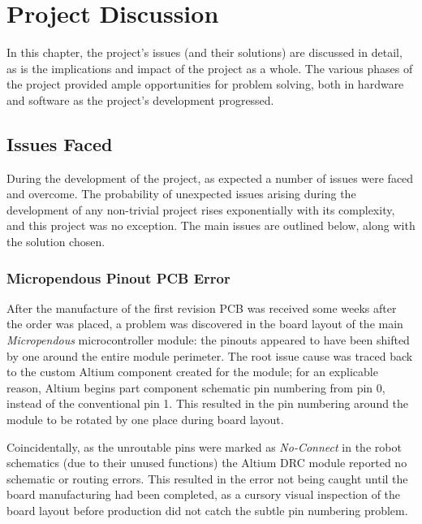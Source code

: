 \chapter{Project Discussion}
\label{chp:discussion}

In this chapter, the project's issues (and their solutions) are discussed in detail, as is the implications and impact of the project as a whole. The various phases of the project provided ample opportunities for problem solving, both in hardware and software as the project's development progressed.

\section{Issues Faced}

During the development of the project, as expected a number of issues were faced and overcome. The probability of unexpected issues arising during the development of any non-trivial project rises exponentially with its complexity, and this project was no exception. The main issues are outlined below, along with the solution chosen.

\subsection{Micropendous Pinout PCB Error}

After the manufacture of the first revision PCB was received some weeks after the order was placed, a problem was discovered in the board layout of the main \textit{Micropendous} microcontroller module: the pinouts appeared to have been shifted by one around the entire module perimeter. The root issue cause was traced back to the custom Altium component created for the module; for an explicable reason, Altium begins part component schematic pin numbering from pin 0, instead of the conventional pin 1. This resulted in the pin numbering around the module to be rotated by one place during board layout.


Coincidentally, as the unroutable pins were marked as \textit{No-Connect} in the robot schematics (due to their unused functions) the Altium DRC module reported no schematic or routing errors. This resulted in the error not being caught until the board manufacturing had been completed, as a cursory visual inspection of the board layout before production did not catch the subtle pin numbering problem.

